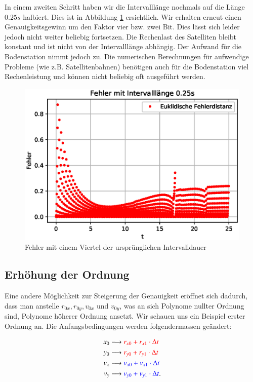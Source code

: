 In einem zweiten Schritt haben wir die Intervalllänge nochmals auf die Länge $0.25s$ halbiert.
Dies ist in Abbildung \ref{errorShortInterval2} ersichtlich.
Wir erhalten erneut einen Genauigkeitsgewinn um den Faktor vier bzw. zwei Bit.
Dies lässt sich leider jedoch nicht weiter beliebig fortsetzen.
Die Rechenlast des Satelliten bleibt konstant und ist nicht von der Intervalllänge abhängig.
Der Aufwand für die Bodenstation nimmt jedoch zu.
Die numerischen Berechnungen für aufwendige Probleme (wie z.B. Satellitenbahnen) benötigen auch für die Bodenstation viel Rechenleistung und
können nicht beliebig oft ausgeführt werden.

\begin{figure}
    \centering
    \includegraphics[scale=0.7]{papers/perturbation/bilder/perturbation_fig5.eps}
    \caption{Fehler mit einem Viertel der ursprünglichen Intervalldauer}
	\label{errorShortInterval2}
\end{figure}

\subsection{Erhöhung der Ordnung}
Eine andere Möglichkeit zur Steigerung der Genauigkeit eröffnet sich dadurch,
dass man anstelle $r_{0x}, r_{0y}, v_{0x}$ und $v_{0y}$,
was an sich Polynome nullter Ordnung sind, Polynome höherer Ordnung ansetzt.
Wir schauen uns ein Beispiel erster Ordnung an.
Die Anfangsbedingungen werden folgendermassen geändert:

\begin{equation}
\label{eq:ordnung1_linear_ansatz}
\begin{aligned}
x_0 &\longrightarrow \textcolor{red}{r_{x0} +  r_{x1}  \cdot \Delta t}\\
y_0 &\longrightarrow \textcolor{red}{r_{y0} +  r_{y1}  \cdot \Delta t}\\
v_x &\longrightarrow \textcolor{blue}{v_{x0} + v_{x1}  \cdot \Delta t}\\
v_y &\longrightarrow \textcolor{blue}{v_{y0} + v_{y1}  \cdot \Delta t}.
\end{aligned}
\end{equation}


